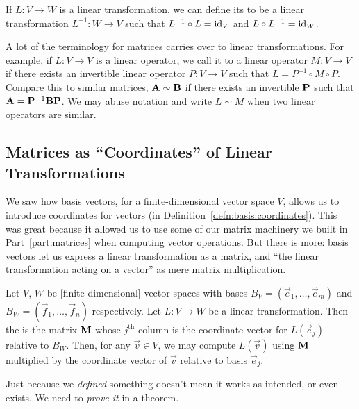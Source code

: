\begin{definition}
If $L\colon V\to W$ is a linear transformation, we can define its
 to be a linear transformation $L^{-1}\colon W\to V$
such that $L^{-1}\circ L=\mathrm{id}_{V}$ and $L\circ L^{-1}=\mathrm{id}_{W}$.
\end{definition}

\M
A lot of the terminology for matrices carries over to linear
transformations. For example, if $L\colon V\to V$ is a linear operator,
we call it  to a linear operator $M\colon V\to V$ if
there exists an invertible linear operator $P\colon V\to V$ such that
$L = P^{-1}\circ M \circ P$.
Compare this to similar matrices, $\mathbf{A} \sim\mathbf{B}$ if there exists
an invertible $\mathbf{P}$ such that $\mathbf{A}=\mathbf{P}^{-1}\mathbf{B}\mathbf{P}$.
We may abuse notation and write $L\sim M$ when two linear operators are
similar.

\subsection{Matrices as ``Coordinates'' of Linear Transformations}

\M
We saw how basis vectors, for a finite-dimensional vector space $V$,
allows us to introduce coordinates for vectors (in
Definition~\ref{defn:basis:coordinates}).
This was great because it allowed us to use some of our matrix machinery
we built in Part~\ref{part:matrices} when computing vector operations.
But there is more: basis vectors let us express a linear transformation
as a matrix, and ``the linear transformation acting on a vector'' as
mere matrix multiplication.

\begin{definition}
Let $V$, $W$ be [finite-dimensional] vector spaces with bases
$B_{V}=(\vec{e}_{1},\dots,\vec{e}_{m})$ and $B_{W}=(\vec{f}_{1},\dots,\vec{f}_{n})$
respectively. Let $L\colon V\to W$ be a linear transformation.
Then the 
is the matrix $\mathbf{M}$ whose $j^{\text{th}}$ column is the coordinate vector
for $L(\vec{e}_{j})$ relative to $B_{W}$.
Then, for any $\vec{v}\in V$, we may compute $L(\vec{v})$ using
$\mathbf{M}$ multiplied by the coordinate vector of $\vec{v}$ relative to
basis $\vec{e}_{j}$.
\end{definition}

\begin{remark}
Just because we \emph{defined} something doesn't mean it works as
intended, or even exists. We need to \emph{prove it} in a theorem.
\end{remark}

